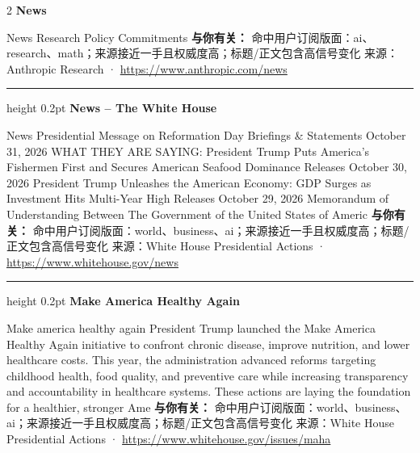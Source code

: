 \documentclass[10.5pt]{ctexart}
\begin{document}
\begin{multicols}{2}
{\large\bfseries News}\par
News Research Policy Commitments
\textbf{与你有关：} 命中用户订阅版面：ai、research、math；来源接近一手且权威度高；标题/正文包含高信号变化
{\footnotesize\color{ormuted} 来源：Anthropic Research · \url{https://www.anthropic.com/news}}
\vspace{2mm}
\hrule height 0.2pt
\vspace{2mm}
{\large\bfseries News – The White House}\par
News Presidential Message on Reformation Day Briefings \& Statements October 31, 2026 WHAT THEY ARE SAYING: President Trump Puts America’s Fishermen First and Secures American Seafood Dominance Releases October 30, 2026 President Trump Unleashes the American Economy: GDP Surges as Investment Hits Multi-Year High Releases October 29, 2026 Memorandum of Understanding Between The Government of the United States of Americ
\textbf{与你有关：} 命中用户订阅版面：world、business、ai；来源接近一手且权威度高；标题/正文包含高信号变化
{\footnotesize\color{ormuted} 来源：White House Presidential Actions · \url{https://www.whitehouse.gov/news}}
\vspace{2mm}
\hrule height 0.2pt
\vspace{2mm}
{\large\bfseries Make America Healthy Again}\par
Make america healthy again President Trump launched the Make America Healthy Again initiative to confront chronic disease, improve nutrition, and lower healthcare costs. This year, the administration advanced reforms targeting childhood health, food quality, and preventive care while increasing transparency and accountability in healthcare systems. These actions are laying the foundation for a healthier, stronger Ame
\textbf{与你有关：} 命中用户订阅版面：world、business、ai；来源接近一手且权威度高；标题/正文包含高信号变化
{\footnotesize\color{ormuted} 来源：White House Presidential Actions · \url{https://www.whitehouse.gov/issues/maha}}
\end{multicols}
\end{document}
